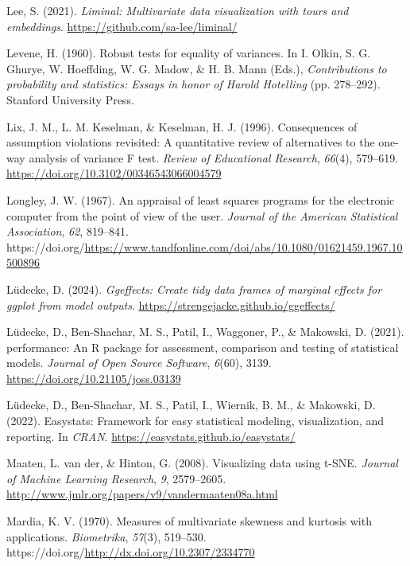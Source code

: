\documentclass[
  letterpaper,
  10pt,
  krantz2]{krantz}
\newlength{\cslhangindent}
\newenvironment{CSLReferences}[2] %
 {\begin{list}{}{%
  \setlength{\itemindent}{0pt}
  \setlength{\leftmargin}{0pt}
  \setlength{\parsep}{0pt}
  \ifodd #1
   \setlength{\leftmargin}{\cslhangindent}
   \setlength{\itemindent}{-1\cslhangindent}
  \fi
  \setlength{\itemsep}{#2\baselineskip}}}
 {\end{list}}
\begin{document}
\begin{CSLReferences}{1}{0}
Lee, S. (2021). \emph{Liminal: Multivariate data visualization with
tours and embeddings}. \url{https://github.com/sa-lee/liminal/}

Levene, H. (1960). Robust tests for equality of variances. In I. Olkin,
S. G. Ghurye, W. Hoeffding, W. G. Madow, \& H. B. Mann (Eds.),
\emph{Contributions to probability and statistics: Essays in honor of
{Harold Hotelling}} (pp. 278--292). Stanford University Press.

Lix, J. M., L. M. Keselman, \& Keselman, H. J. (1996). Consequences of
assumption violations revisited: A quantitative review of alternatives
to the one-way analysis of variance {F} test. \emph{Review of
Educational Research}, \emph{66}(4), 579--619.
\url{https://doi.org/10.3102/00346543066004579}

Longley, J. W. (1967). An appraisal of least squares programs for the
electronic computer from the point of view of the user. \emph{Journal of
the American Statistical Association}, \emph{62}, 819--841.
https://doi.org/\url{https://www.tandfonline.com/doi/abs/10.1080/01621459.1967.10500896}

Lüdecke, D. (2024). \emph{Ggeffects: Create tidy data frames of marginal
effects for ggplot from model outputs}.
\url{https://strengejacke.github.io/ggeffects/}

Lüdecke, D., Ben-Shachar, M. S., Patil, I., Waggoner, P., \& Makowski,
D. (2021). {performance}: An {R} package for assessment, comparison and
testing of statistical models. \emph{Journal of Open Source Software},
\emph{6}(60), 3139. \url{https://doi.org/10.21105/joss.03139}

Lüdecke, D., Ben-Shachar, M. S., Patil, I., Wiernik, B. M., \& Makowski,
D. (2022). Easystats: Framework for easy statistical modeling,
visualization, and reporting. In \emph{CRAN}.
\url{https://easystats.github.io/easystats/}

Maaten, L. van der, \& Hinton, G. (2008). Visualizing data using
{t-SNE}. \emph{Journal of Machine Learning Research}, \emph{9},
2579--2605. \url{http://www.jmlr.org/papers/v9/vandermaaten08a.html}

Mardia, K. V. (1970). Measures of multivariate skewness and kurtosis
with applications. \emph{Biometrika}, \emph{57}(3), 519--530.
https://doi.org/\url{http://dx.doi.org/10.2307/2334770}


\end{CSLReferences}
\end{document}
